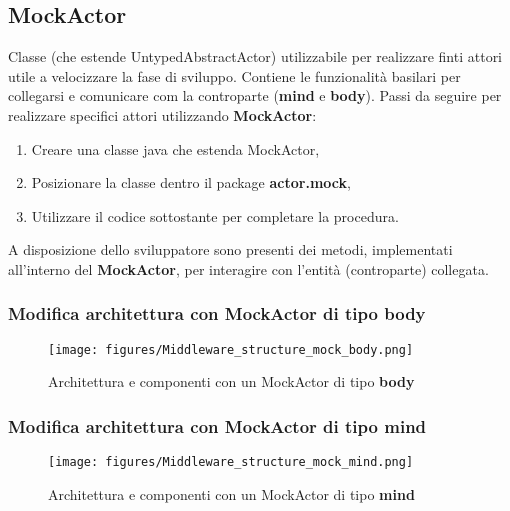 \subsection{MockActor}
Classe (che estende UntypedAbstractActor) utilizzabile per realizzare finti attori utile a velocizzare la fase di sviluppo. Contiene le funzionalità basilari per collegarsi e comunicare com la controparte (\textbf{mind} e \textbf{body}).
Passi da seguire per realizzare specifici attori utilizzando \textbf{MockActor}:
\begin{enumerate}
    \item Creare una classe java che estenda MockActor,
    \item Posizionare la classe dentro il package \textbf{actor.mock},
    \item Utilizzare il codice sottostante per completare la procedura.
\end{enumerate}



A disposizione dello sviluppatore sono presenti dei metodi, implementati all'interno del \textbf{MockActor}, per interagire con l'entità (controparte) collegata.



\subsubsection{Modifica architettura con MockActor di tipo \textbf{body}}

\begin{figure}[H]
\centering
\texttt{[image: figures/Middleware\_structure\_mock\_body.png]}
\caption{Architettura e componenti con un MockActor di tipo \textbf{body}}
\end{figure}

\subsubsection{Modifica architettura con MockActor di tipo \textbf{mind}}

\begin{figure}[H]
\centering
\texttt{[image: figures/Middleware\_structure\_mock\_mind.png]}
\caption{Architettura e componenti con un MockActor di tipo \textbf{mind}}
\end{figure}

